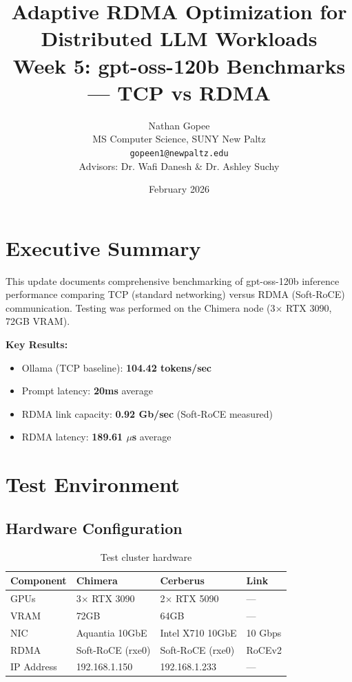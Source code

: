\documentclass[10pt,letterpaper]{article}
\title{\textbf{Adaptive RDMA Optimization for Distributed LLM Workloads}\\[0.5em]
\large Week 5: gpt-oss-120b Benchmarks --- TCP vs RDMA}
\author{Nathan Gopee\\
MS Computer Science, SUNY New Paltz\\
\texttt{gopeen1@newpaltz.edu}\\[1em]
\small Advisors: Dr. Wafi Danesh \& Dr. Ashley Suchy}
\date{February 2026}
\begin{document}
\maketitle

\section{Executive Summary}

This update documents comprehensive benchmarking of gpt-oss-120b inference performance comparing TCP (standard networking) versus RDMA (Soft-RoCE) communication. Testing was performed on the Chimera node (3$\times$ RTX 3090, 72GB VRAM).

\textbf{Key Results:}
\begin{itemize}[noitemsep]
    \item Ollama (TCP baseline): \textbf{104.42 tokens/sec}
    \item Prompt latency: \textbf{20ms} average
    \item RDMA link capacity: \textbf{0.92 Gb/sec} (Soft-RoCE measured)
    \item RDMA latency: \textbf{189.61 $\mu$s} average
\end{itemize}

\section{Test Environment}

\subsection{Hardware Configuration}

\begin{table}[H]
\centering
\small
\begin{tabular}{@{}llll@{}}
\toprule
\textbf{Component} & \textbf{Chimera} & \textbf{Cerberus} & \textbf{Link} \\
\midrule
GPUs & 3$\times$ RTX 3090 & 2$\times$ RTX 5090 & --- \\
VRAM & 72GB & 64GB & --- \\
NIC & Aquantia 10GbE & Intel X710 10GbE & 10 Gbps \\
RDMA & Soft-RoCE (rxe0) & Soft-RoCE (rxe0) & RoCEv2 \\
IP Address & 192.168.1.150 & 192.168.1.233 & --- \\
\bottomrule
\end{tabular}
\caption{Test cluster hardware}
\end{table}
\end{document}

